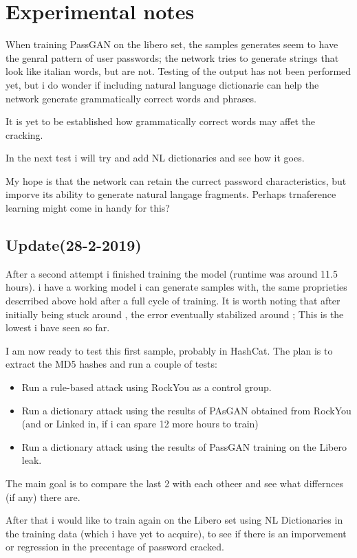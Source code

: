 \section{Experimental notes}
When training PassGAN on the libero set, the samples generates seem to have the genral pattern of user passwords; the network tries to generate strings that look like italian words, but are not. Testing of the output has not been performed yet, but i do wonder if including natural language dictionarie can help the network generate grammatically correct words and phrases.

It is yet to be established how grammatically correct words may affet the cracking.

In the next test i will try and add NL dictionaries and see how it goes. 

My hope is that the network can retain the currect password characteristics, but imporve its ability to generate natural langage fragments. Perhaps trnaference learning might come in handy for this?

\subsection{Update(28-2-2019)}

After a second attempt i finished training the model (runtime was around 11.5 hours). i have a working model i can generate samples with, the same proprieties descrribed above hold after a full cycle of training. It is worth noting that after initially being stuck around , the error eventually stabilized around ; This is the lowest i have seen so far.

I am now ready to test this first sample, probably in HashCat. The plan is to extract the MD5 hashes and run a couple of tests:

\begin{itemize}
\item Run a rule-based attack using RockYou as a control group.
\item Run a dictionary attack using the results of PAsGAN obtained from RockYou (and or Linked in, if i can spare 12 more hours to train)
\item Run a dictionary attack using the results of PassGAN training on the Libero leak.
\end{itemize}

The main goal is to compare the last 2 with each otheer and see what differnces (if any) there are.

After that i would like to train again on the Libero set using NL Dictionaries in the training data (which i have yet to acquire), to see if there is an imporvement or regression in the precentage of password cracked.
